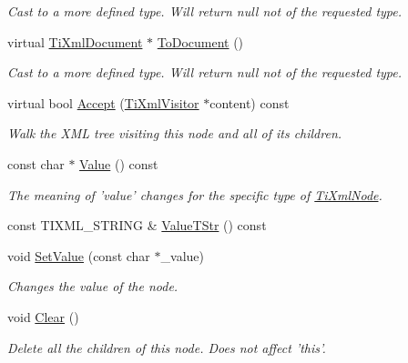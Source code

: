 \begin{DoxyCompactItemize}
\begin{DoxyCompactList}\small\item\em Cast to a more defined type. Will return null not of the requested type. \item\end{DoxyCompactList}\item 
virtual \hyperlink{classTiXmlDocument}{TiXmlDocument} $\ast$ \hyperlink{classTiXmlDocument_a1025d942a1f328fd742d545e37efdd42}{ToDocument} ()
\begin{DoxyCompactList}\small\item\em Cast to a more defined type. Will return null not of the requested type. \item\end{DoxyCompactList}\item 
virtual bool \hyperlink{classTiXmlDocument_a3daab2f472418ef66315750202f762ae}{Accept} (\hyperlink{classTiXmlVisitor}{TiXmlVisitor} $\ast$content) const 
\begin{DoxyCompactList}\small\item\em Walk the XML tree visiting this node and all of its children. \item\end{DoxyCompactList}\item 
const char $\ast$ \hyperlink{classTiXmlNode_a77943eb90d12c2892b1337a9f5918b41}{Value} () const 
\begin{DoxyCompactList}\small\item\em The meaning of 'value' changes for the specific type of \hyperlink{classTiXmlNode}{TiXmlNode}. \item\end{DoxyCompactList}\item 
const TIXML\_\-STRING \& \hyperlink{classTiXmlNode_a83ece13d2ea66dac66e0b21332229239}{ValueTStr} () const 
\item 
void \hyperlink{classTiXmlNode_a2a38329ca5d3f28f98ce932b8299ae90}{SetValue} (const char $\ast$\_\-value)
\begin{DoxyCompactList}\small\item\em Changes the value of the node. \item\end{DoxyCompactList}\item 
void \hyperlink{classTiXmlNode_a708e7f953df61d4d2d12f73171550a4b}{Clear} ()
\begin{DoxyCompactList}\small\item\em Delete all the children of this node. Does not affect 'this'. \item\end{DoxyCompactList}\item 

\end{DoxyCompactItemize}
